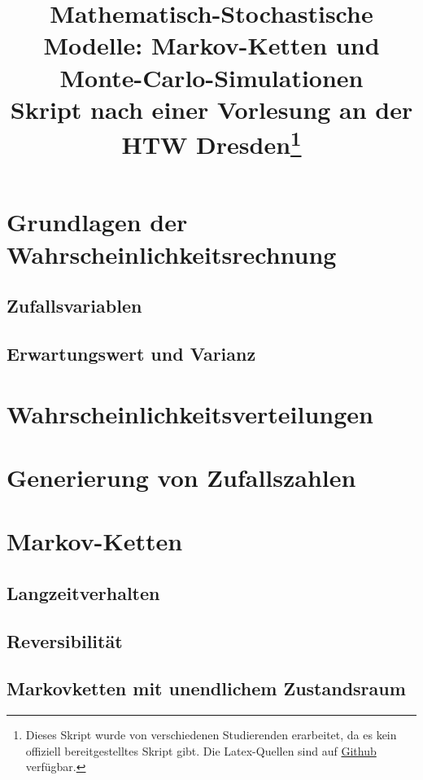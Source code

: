 \documentclass{report}
\title{%
\huge\textbf{Mathematisch-Stochastische Modelle: Markov-Ketten und Monte-Carlo-Simulationen} \\
[2em]\large Skript nach einer Vorlesung an der HTW Dresden\thanks{Dieses Skript
wurde von verschiedenen Studierenden erarbeitet, da es kein offiziell
bereitgestelltes Skript gibt. Die Latex-Quellen sind auf
\href{https://github.com/burrscurr/msm}{Github} verfügbar.}
}
\theoremstyle{lemmastyle}
\begin{document}
  \maketitle

  \tableofcontents

  \chapter{Grundlagen der Wahrscheinlichkeitsrechnung}
    
    \section{Zufallsvariablen}
    
    \section{Erwartungswert und Varianz}
    

  \chapter{Wahrscheinlichkeitsverteilungen}
    

  \chapter{Generierung von Zufallszahlen}
    

  

  \chapter{Markov-Ketten}
    
    \section{Langzeitverhalten}
    
    \section{Reversibilität}
    
    \section{Markovketten mit unendlichem Zustandsraum}
    

  \printbibliography
\end{document}
